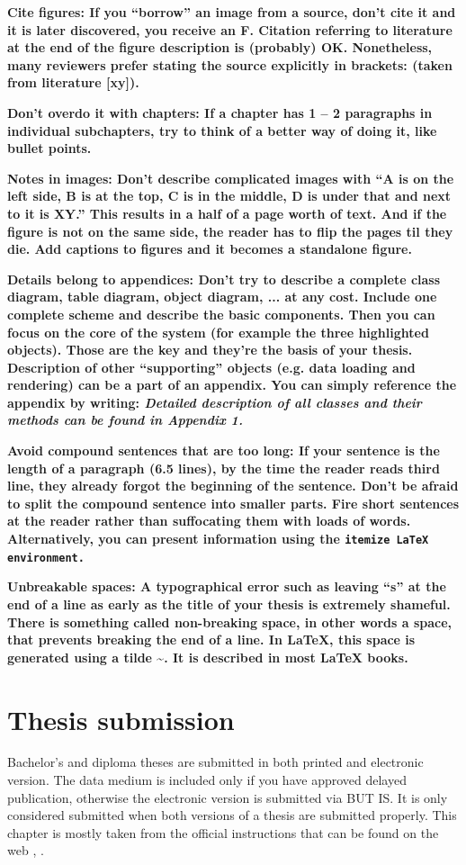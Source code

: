 \bf Cite figures: \rm If you ``borrow'' an image from a source, don't cite it and it is later discovered, you receive an F. Citation referring to literature at the end of the figure description is (probably) OK. Nonetheless, many reviewers prefer stating the source explicitly in brackets: (taken from literature [xy]).

\bf Don't overdo it with chapters: \rm If a chapter has 1 -- 2 paragraphs in individual subchapters, try to think of a better way of doing it, like bullet points.

\bf Notes in images: \rm Don't describe complicated images with ``A is on the left side, B is at the top, C is in the middle, D is under that and next to it is XY.'' This results in a half of a page worth of text. And if the figure is not on the same side, the reader has to flip the pages til they die. Add captions to figures and it becomes a standalone figure.

\bf Details belong to appendices: \rm Don't try to describe a complete class diagram, table diagram, object diagram, ... at any cost. Include one complete scheme and describe the basic components. Then you can focus on the core of the system (for example the three highlighted objects). Those are the key and they're the basis of your thesis. Description of other ``supporting'' objects (e.g. data loading and rendering) can be a part of an appendix. You can simply reference the appendix by writing: \it Detailed description of all classes and their methods can be found in Appendix 1. \rm

\bf Avoid compound sentences that are too long: \rm If your sentence is the length of a paragraph (6.5 lines), by the time the reader reads third line, they already forgot the beginning of the sentence. Don't be afraid to split the compound sentence into smaller parts. Fire short sentences at the reader rather than suffocating them with loads of words. Alternatively, you can present information using the \tt itemize \rm LaTeX environment.

\bf Unbreakable spaces: \rm A typographical error such as leaving ``s'' at the end of a line as early as the title of your thesis is extremely shameful. There is something called non-breaking space, in other words a space, that prevents breaking the end of a line. In LaTeX, this space is generated using a tilde \textasciitilde. It is described in most \LaTeX{} books.

\chapter{Thesis submission}
\label{odevzdani}
Bachelor's and diploma theses are submitted in both printed and electronic version. The data medium is included only if you have approved delayed publication, otherwise the electronic version is submitted via BUT IS. It is only considered submitted when both versions of a thesis are submitted properly. This chapter is mostly taken from the official instructions that can be found on the web \cite{formalniBP}, \cite{formalniDP}.

